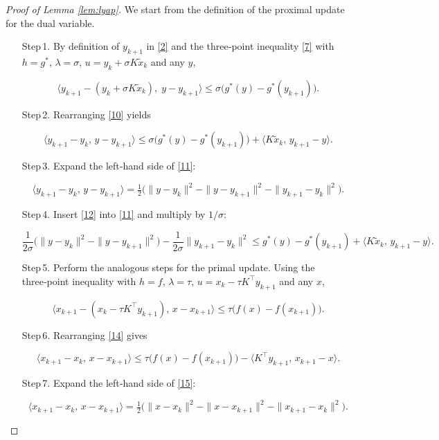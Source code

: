 \documentclass{article}
\begin{document}
\begin{proof}[Proof of Lemma \ref{lem:lyap}]
We start from the definition of the proximal update for the dual variable.
\begin{enumerate}
\item[Step 1.] By definition of \(y_{k+1}\) in \eqref{2} and the three‑point inequality \eqref{7} with \(h=g^{*}\), \(\lambda=\sigma\), \(u=y_{k}+\sigma K\tilde{x}_{k}\) and any \(y\),

\[
\langle y_{k+1}-(y_{k}+\sigma K\tilde{x}_{k}),\; y-y_{k+1}\rangle
\le
\sigma\bigl(g^{*}(y)-g^{*}(y_{k+1})\bigr).
\tag{10}
\]

\item[Step 2.] Rearranging \eqref{10} yields

\[
\langle y_{k+1}-y_{k},\,y-y_{k+1}\rangle
\le
\sigma\bigl(g^{*}(y)-g^{*}(y_{k+1})\bigr)
+ \langle K\tilde{x}_{k},\,y_{k+1}-y\rangle .
\tag{11}
\]

\item[Step 3.] Expand the left‑hand side of \eqref{11}:

\[
\langle y_{k+1}-y_{k},\,y-y_{k+1}\rangle
= \tfrac12\bigl(\|y-y_{k}\|^{2}-\|y-y_{k+1}\|^{2}-\|y_{k+1}-y_{k}\|^{2}\bigr).
\tag{12}
\]

\item[Step 4.] Insert \eqref{12} into \eqref{11} and multiply by \(1/\sigma\):

\[
\frac{1}{2\sigma}\bigl(\|y-y_{k}\|^{2}-\|y-y_{k+1}\|^{2}\bigr)
-\frac{1}{2\sigma}\|y_{k+1}-y_{k}\|^{2}
\le
g^{*}(y)-g^{*}(y_{k+1})+\langle K\tilde{x}_{k},\,y_{k+1}-y\rangle .
\tag{13}
\]

\item[Step 5.] Perform the analogous steps for the primal update.  
Using the three‑point inequality with \(h=f\), \(\lambda=\tau\), \(u=x_{k}-\tau K^{\top}y_{k+1}\) and any \(x\),

\[
\langle x_{k+1}-(x_{k}-\tau K^{\top}y_{k+1}),\,x-x_{k+1}\rangle
\le
\tau\bigl(f(x)-f(x_{k+1})\bigr).
\tag{14}
\]

\item[Step 6.] Rearranging \eqref{14} gives

\[
\langle x_{k+1}-x_{k},\,x-x_{k+1}\rangle
\le
\tau\bigl(f(x)-f(x_{k+1})\bigr)
- \langle K^{\top}y_{k+1},\,x_{k+1}-x\rangle .
\tag{15}
\]

\item[Step 7.] Expand the left‑hand side of \eqref{15}:

\[
\langle x_{k+1}-x_{k},\,x-x_{k+1}\rangle
= \tfrac12\bigl(\|x-x_{k}\|^{2}-\|x-x_{k+1}\|^{2}-\|x_{k+1}-x_{k}\|^{2}\bigr).
\tag{16}
\]


\end{enumerate}
\end{proof}
\end{document}
